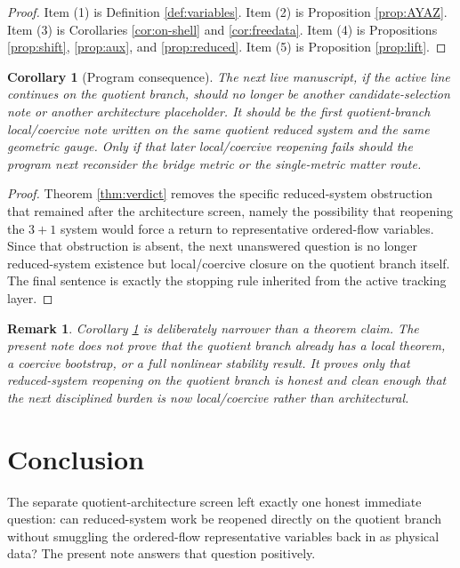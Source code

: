 \documentclass[11pt]{article}
\newtheorem{remark}{Remark}
\newtheorem{corollary}{Corollary}
\begin{document}
\begin{proof}
Item (1) is Definition \ref{def:variables}. Item (2) is Proposition \ref{prop:AYAZ}. Item (3) is Corollaries \ref{cor:on-shell} and \ref{cor:freedata}. Item (4) is Propositions \ref{prop:shift}, \ref{prop:aux}, and \ref{prop:reduced}. Item (5) is Proposition \ref{prop:lift}.
\end{proof}

\begin{corollary}[Program consequence]
\label{cor:next}
The next live manuscript, if the active line continues on the quotient branch, should no longer be another candidate-selection note or another architecture placeholder. It should be the first quotient-branch local/coercive note written on the same quotient reduced system and the same geometric gauge. Only if that later local/coercive reopening fails should the program next reconsider the bridge metric or the single-metric matter route.
\end{corollary}

\begin{proof}
Theorem \ref{thm:verdict} removes the specific reduced-system obstruction that remained after the architecture screen, namely the possibility that reopening the \(3+1\) system would force a return to representative ordered-flow variables. Since that obstruction is absent, the next unanswered question is no longer reduced-system existence but local/coercive closure on the quotient branch itself. The final sentence is exactly the stopping rule inherited from the active tracking layer.
\end{proof}

\begin{remark}
Corollary \ref{cor:next} is deliberately narrower than a theorem claim. The present note does \emph{not} prove that the quotient branch already has a local theorem, a coercive bootstrap, or a full nonlinear stability result. It proves only that reduced-system reopening on the quotient branch is honest and clean enough that the next disciplined burden is now local/coercive rather than architectural.
\end{remark}

\section{Conclusion}

The separate quotient-architecture screen left exactly one honest immediate question: can reduced-system work be reopened directly on the quotient branch without smuggling the ordered-flow representative variables back in as physical data? The present note answers that question positively.
\end{document}
